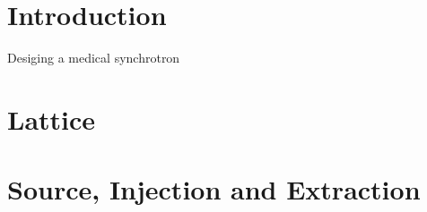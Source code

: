 \section{Introduction}
Desiging a medical synchrotron
\section{Lattice}

\section{Source, Injection and Extraction}


